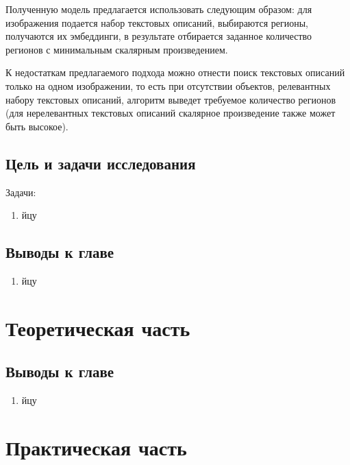 \documentclass[a4paper,14pt]{article}
\begin{document}
	Полученную модель предлагается использовать следующим образом: для изображения подается набор текстовых описаний, выбираются регионы, получаются их эмбеддинги, в результате отбирается заданное количество регионов с минимальным скалярным произведением. 
	
	К недостаткам предлагаемого подхода можно отнести поиск текстовых описаний только на одном изображении, то есть при отсутствии объектов, релевантных набору текстовых описаний, алгоритм  выведет требуемое количество регионов (для нерелевантных текстовых описаний скалярное произведение также может быть высокое).
	
    \subsection{Цель и задачи исследования}

    Задачи:
    \begin{enumerate}
        [1)]
        \itemsep0em
        \item йцу

    \end{enumerate}

    \subsection{Выводы к главе \thesection}
    \begin{enumerate}
        [1)]
        \itemsep0em
        \item йцу
    \end{enumerate}

    \newpage


    \section{Теоретическая часть}

    \subsection{Выводы к главе \thesection}
    \begin{enumerate}
        [1)]
        \itemsep0em
        \item йцу
    \end{enumerate}

    \newpage


    \section{Практическая часть}
\end{document}
